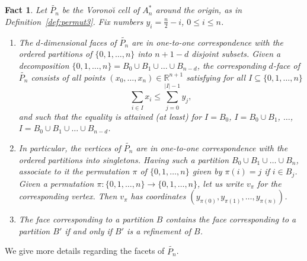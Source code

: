 \documentclass[12pt,a4paper,oneside]{amsart}
\newtheorem{fact}[theorem]{Fact}
\theoremstyle{definition}
\theoremstyle{remark}
\numberwithin{equation}{section}
\begin{document}
\begin{fact}
\label{fact:combipermut}
Let $\widetilde{P_n}$ be the Vorono\u{\i} cell of $A_n^*$ around the origin, as in Definition~\ref{def:permut3}. Fix numbers $y_i = \frac{n}{2} - i$, $0 \le i \le n$.
\begin{enumerate}
\item
The $d$-dimensional faces of $\widetilde{P_n}$ are in one-to-one correspondence with the ordered partitions of $\{0,1,\ldots,n\}$ into $n+1-d$ disjoint subsets. Given a decomposition $\{0,1,\ldots,n\} = B_0 \cup B_1 \cup \ldots \cup B_{n-d}$, the corresponding $d$-face of $\widetilde{P_n}$ consists of all points $(x_0, \ldots, x_n) \in \mathbb{R}^{n+1}$ satisfying for all $I \subseteq \{0,1,\ldots,n\}$
$$
\sum\limits_{i \in I} x_i \le \sum\limits_{j = 0}^{|I|-1} y_j,
$$
and such that the equality is attained (at least) for $I = B_0$, $I = B_0 \cup B_1$, $\ldots$, $I = B_0 \cup B_1 \cup \ldots \cup B_{n-d}$.

\item In particular, the vertices of $\widetilde{P_n}$ are in one-to-one correspondence with the ordered partitions into singletons. Having such a partition $B_0 \cup B_1 \cup \ldots \cup B_{n}$, associate to it the permutation $\pi$ of $\{0,1,\ldots,n\}$ given by $\pi(i) = j$ if $i \in B_j$. Given a permutation $\pi : \{0,1,\ldots,n\} \to \{0,1,\ldots,n\}$, let us write $v_\pi$ for the corresponding vertex. Then $v_\pi$ has coordinates $(y_{\pi(0)}, y_{\pi(1)}, \ldots, y_{\pi(n)})$. %

\item The face corresponding to a partition $B$ contains the face corresponding to a partition $B'$ if and only if $B'$ is a refinement of $B$.

\end{enumerate}
\end{fact}

We give more details regarding the facets of $\widetilde{P_n}$.
\end{document}
